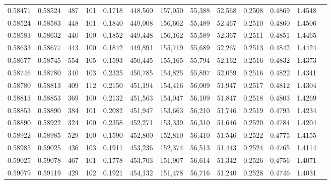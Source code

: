 \begin{tabular}{rrrrrrrrrrrrr}
0.58471 & 0.58524 &   487 & 101 &                                     0.1718 & 448,560 & 157,050 &  55,388 &  52,568 & 0.2508 & 0.4869 & 1.4548 \\
0.58524 & 0.58583 &   448 & 101 &                                     0.1840 & 449,008 & 156,602 &  55,489 &  52,467 & 0.2510 & 0.4860 & 1.4506 \\
0.58583 & 0.58632 &   440 & 100 &                                     0.1852 & 449,448 & 156,162 &  55,589 &  52,367 & 0.2511 & 0.4851 & 1.4465 \\
0.58633 & 0.58677 &   443 & 100 &                                     0.1842 & 449,891 & 155,719 &  55,689 &  52,267 & 0.2513 & 0.4842 & 1.4424 \\
0.58677 & 0.58745 &   554 & 105 &                                     0.1593 & 450,445 & 155,165 &  55,794 &  52,162 & 0.2516 & 0.4832 & 1.4373 \\
0.58746 & 0.58780 &   340 & 103 &                                     0.2325 & 450,785 & 154,825 &  55,897 &  52,059 & 0.2516 & 0.4822 & 1.4341 \\
0.58780 & 0.58813 &   409 & 112 &                                     0.2150 & 451,194 & 154,416 &  56,009 &  51,947 & 0.2517 & 0.4812 & 1.4304 \\
0.58813 & 0.58853 &   369 & 100 &                                     0.2132 & 451,563 & 154,047 &  56,109 &  51,847 & 0.2518 & 0.4803 & 1.4269 \\
0.58853 & 0.58890 &   384 & 101 &                                     0.2082 & 451,947 & 153,663 &  56,210 &  51,746 & 0.2519 & 0.4793 & 1.4234 \\
0.58890 & 0.58922 &   324 & 100 &                                     0.2358 & 452,271 & 153,339 &  56,310 &  51,646 & 0.2520 & 0.4784 & 1.4204 \\
0.58922 & 0.58985 &   529 & 100 &                                     0.1590 & 452,800 & 152,810 &  56,410 &  51,546 & 0.2522 & 0.4775 & 1.4155 \\
0.58985 & 0.59025 &   436 & 103 &                                     0.1911 & 453,236 & 152,374 &  56,513 &  51,443 & 0.2524 & 0.4765 & 1.4114 \\
0.59025 & 0.59078 &   467 & 101 &                                     0.1778 & 453,703 & 151,907 &  56,614 &  51,342 & 0.2526 & 0.4756 & 1.4071 \\
0.59079 & 0.59119 &   429 & 102 &                                     0.1921 & 454,132 & 151,478 &  56,716 &  51,240 & 0.2528 & 0.4746 & 1.4031 \\

\end{tabular}
